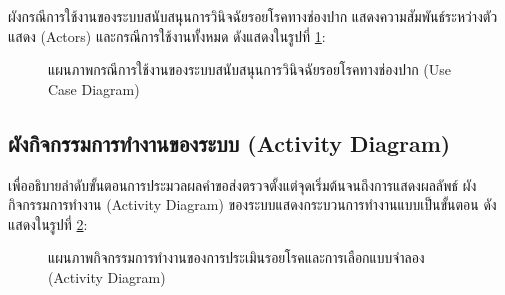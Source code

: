 ผังกรณีการใช้งานของระบบสนับสนุนการวินิจฉัยรอยโรคทางช่องปาก แสดงความสัมพันธ์ระหว่างตัวแสดง (Actors) และกรณีการใช้งานทั้งหมด ดังแสดงในรูปที่ \ref{fig:usecase_diagram}:

\begin{figure}[htbp]
\centering
{}
\caption{แผนภาพกรณีการใช้งานของระบบสนับสนุนการวินิจฉัยรอยโรคทางช่องปาก (Use Case Diagram)}
\label{fig:usecase_diagram}
\end{figure}

\subsection{ผังกิจกรรมการทำงานของระบบ (Activity Diagram)}
เพื่ออธิบายลำดับขั้นตอนการประมวลผลคำขอส่งตรวจตั้งแต่จุดเริ่มต้นจนถึงการแสดงผลลัพธ์ ผังกิจกรรมการทำงาน (Activity Diagram) ของระบบแสดงกระบวนการทำงานแบบเป็นขั้นตอน ดังแสดงในรูปที่ \ref{fig:activity_diagram}:

\begin{figure}[htbp]
\centering
{}
\caption{แผนภาพกิจกรรมการทำงานของการประเมินรอยโรคและการเลือกแบบจำลอง (Activity Diagram)}
\label{fig:activity_diagram}
\end{figure}

